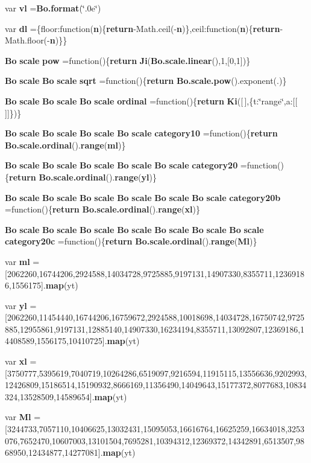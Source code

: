 \begin{DoxyCompactItemize}
\item 
var {\bf vl} ={\bf Bo.\+format}(\char`\"{}.\+0e\char`\"{})
\item 
var {\bf dl} =\{floor\+:function({\bf n})\{{\bf return}-\/Math.\+ceil(-\/{\bf n})\},ceil\+:function({\bf n})\{{\bf return}-\/Math.\+floor(-\/{\bf n})\}\}
\item 
{\bf Bo} {\bf scale} {\bf pow} =function()\{{\bf return} {\bf Ji}({\bf Bo.\+scale.\+linear}(),1,[0,1])\}
\item 
{\bf Bo} {\bf scale} {\bf Bo} {\bf scale} {\bf sqrt} =function()\{{\bf return} {\bf Bo.\+scale.\+pow}().exponent(.)\}
\item 
{\bf Bo} {\bf scale} {\bf Bo} {\bf scale} {\bf Bo} {\bf scale} {\bf ordinal} =function()\{{\bf return} {\bf Ki}([$\,$],\{t\+:\char`\"{}range\char`\"{},a\+:[[$\,$]]\})\}
\item 
{\bf Bo} {\bf scale} {\bf Bo} {\bf scale} {\bf Bo} {\bf scale} {\bf Bo} {\bf scale} {\bf category10} =function()\{{\bf return} {\bf Bo.\+scale.\+ordinal}().{\bf range}({\bf ml})\}
\item 
{\bf Bo} {\bf scale} {\bf Bo} {\bf scale} {\bf Bo} {\bf scale} {\bf Bo} {\bf scale} {\bf Bo} {\bf scale} {\bf category20} =function()\{{\bf return} {\bf Bo.\+scale.\+ordinal}().{\bf range}({\bf yl})\}
\item 
{\bf Bo} {\bf scale} {\bf Bo} {\bf scale} {\bf Bo} {\bf scale} {\bf Bo} {\bf scale} {\bf Bo} {\bf scale} {\bf Bo} {\bf scale} {\bf category20b} =function()\{{\bf return} {\bf Bo.\+scale.\+ordinal}().{\bf range}({\bf xl})\}
\item 
{\bf Bo} {\bf scale} {\bf Bo} {\bf scale} {\bf Bo} {\bf scale} {\bf Bo} {\bf scale} {\bf Bo} {\bf scale} {\bf Bo} {\bf scale} {\bf Bo} {\bf scale} {\bf category20c} =function()\{{\bf return} {\bf Bo.\+scale.\+ordinal}().{\bf range}({\bf Ml})\}
\item 
var {\bf ml} =[2062260,16744206,2924588,14034728,9725885,9197131,14907330,8355711,12369186,1556175].{\bf map}(yt)
\item 
var {\bf yl} =[2062260,11454440,16744206,16759672,2924588,10018698,14034728,16750742,9725885,12955861,9197131,12885140,14907330,16234194,8355711,13092807,12369186,14408589,1556175,10410725].{\bf map}(yt)
\item 
var {\bf xl} =[3750777,5395619,7040719,10264286,6519097,9216594,11915115,13556636,9202993,12426809,15186514,15190932,8666169,11356490,14049643,15177372,8077683,10834324,13528509,14589654].{\bf map}(yt)
\item 
var {\bf Ml} =[3244733,7057110,10406625,13032431,15095053,16616764,16625259,16634018,3253076,7652470,10607003,13101504,7695281,10394312,12369372,14342891,6513507,9868950,12434877,14277081].{\bf map}(yt)

\end{DoxyCompactItemize}
